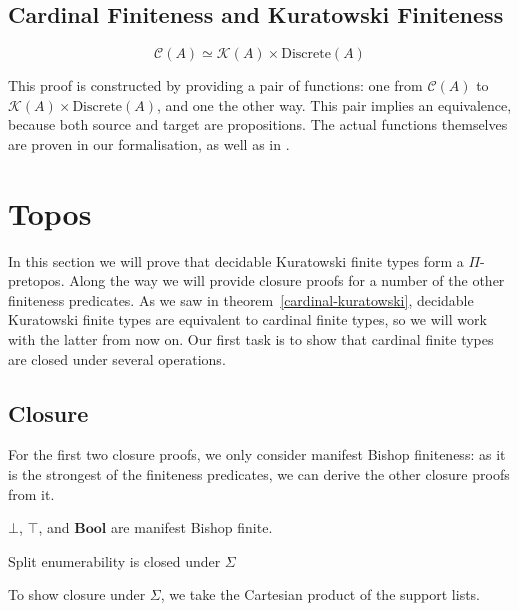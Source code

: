 \subsection{Cardinal Finiteness and Kuratowski Finiteness}
\begin{romlemma} \label{cardinal-kuratowski}
  \begin{equation}
    \mathcal{C}(A) \simeq \mathcal{K}(A) \times \text{Discrete}(A)
  \end{equation}
\end{romlemma}
This proof is constructed by providing a pair of functions: one from
\(\mathcal{C}(A)\) to \(\mathcal{K}(A) \times \text{Discrete}(A)\), and one the
other way.
This pair implies an equivalence, because both source and target are
propositions.
The actual functions themselves are proven in our formalisation, as well as in
\cite{fruminFiniteSetsHomotopy2018}.
\section{Topos} \label{topos}
In this section we will prove that decidable Kuratowski finite types form a
\(\Pi\)-pretopos.
Along the way we will provide closure proofs for a number of the other
finiteness predicates.
As we saw in theorem~\ref{cardinal-kuratowski}, decidable Kuratowski finite
types are equivalent to cardinal finite types, so we will work with the latter
from now on.
Our first task is to show that cardinal finite types are closed under several
operations.
\subsection{Closure}
For the first two closure proofs, we only consider manifest Bishop finiteness:
as it is the strongest of the finiteness predicates, we can derive the other
closure proofs from it.
\begin{romlemma}
  \(\bot\), \(\top\), and \(\mathbf{Bool}\) are manifest Bishop finite.
\end{romlemma}
\begin{romlemma}
  Split enumerability is closed under \(\Sigma\)
\end{romlemma}
To show closure under \(\Sigma\), we take the Cartesian product of the support
lists.


